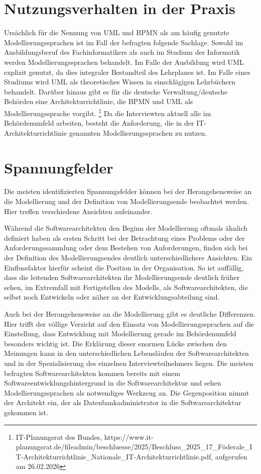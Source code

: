 \section{Nutzungsverhalten in der Praxis}
Ursächlich für die Nennung von UML und BPMN als am häufig genutzte Modellierungssprachen ist im Fall der befragten folgende Sachlage. Sowohl im Ausbildungsberuf des Fachinformatikers als auch im Studium der Informatik werden Modellierungssprachen behandelt. Im Falle der Ausbildung wird UML explizit genutzt, da dies integraler Bestandteil des Lehrplanes ist. Im Falle eines Studiums wird UML als theoretisches Wissen in einschlägigen Lehrbüchern behandelt.
Darüber hinaus gibt es für die deutsche Verwaltung/deutsche Behörden eine Architekturrichtlinie, die BPMN und UML als Modellierungssprache vorgibt.
\footnote{ IT-Planungsrat des Bundes,  https://www.it-planungsrat.de/fileadmin/beschluesse/2025/Beschluss_2025_17_Föderale_IT-Architekturrichtlinie_Nationale_IT-Architekturrichtlinie.pdf, aufgerufen am 26.02.2026}
Da die Interviewten aktuell alle im Behördenumfeld arbeiten, besteht die Anforderung, die in der IT-Architekturrichtlinie genannten Modellierungssprachen zu nutzen. 

\section{Spannungfelder}
Die meisten identifizierten Spannungsfelder können bei der Herangehensweise an die Modellierung und der Definition von Modellierungsende beobachtet werden. Hier treffen verschiedene Ansichten aufeinander. 

Während die Softwarearchitekten den Beginn der Modellierung oftmals ähnlich definiert haben als ersten Schritt bei der Betrachtung eines Problems oder der Anforderungssammlung oder dem Bestehen von Anforderungen, finden sich bei der Definition des Modellierungsendes deutlich unterschiedlichere Ansichten. Ein Einflussfaktor hierfür scheint die Position in der Organisation. So ist auffällig, dass die leitenden Softwarearchitekten ihr Modellierungsende deutlich früher sehen, im Extremfall mit Fertigstellen des Modells, als Softwarearchitekten, die selbst noch Entwickeln oder näher an der Entwicklungsabteilung sind. 

Auch bei der Herangehensweise an die Modellierung gibt es deutliche Differenzen. Hier trifft der völlige Verzicht auf den Einsatz von Modellierungssprachen auf die Einstellung, dass Entwicklung mit Modellierung gerade im Behördenumfeld besonders wichtig ist. Die Erklärung dieser enormen Lücke zwischen den Meinungen kann in den unterschiedlichen Lebensläufen der Softwarearchitekten und in der Spezialisierung des einzelnen Interviewteilnehmers liegen. Die meisten befragten Softwarearchitekten kommen bereits mit einem Softwareentwicklungshintergrund in die Softwarearchitektur und sehen Modellierungssprachen als notwendiges Werkzeug an. Die Gegenposition nimmt der Architekt ein, der als Datenbankadministrator in die Softwarearchitektur gekommen ist.


